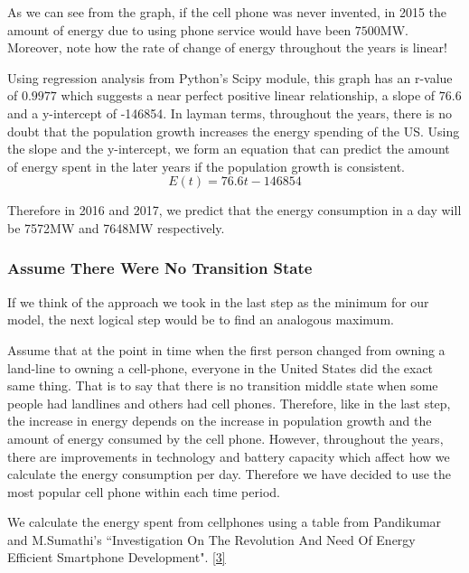 \documentclass{article}
\begin{document}
As we can see from the graph, if the cell phone was never invented, in 2015 the amount of energy due to using phone service would have been $7500 \text{MW}$. Moreover, note how the rate of change of energy throughout the years is linear! \par
Using regression analysis from Python's Scipy module, this graph has an r-value of $0.9977$ which suggests a near perfect positive linear relationship, a slope of $76.6$ and a y-intercept of -146854. In layman terms, throughout the years, there is no doubt that the population growth increases the energy spending of the US. Using the slope and the y-intercept, we form an equation that can predict the amount of energy spent in the later years if the population growth is consistent.
$$ E(t) = 76.6t - 146854 $$ \par
Therefore in 2016 and 2017, we predict that the energy consumption in a day will be 7572MW and 7648MW respectively.\par

%

\subsubsection{Assume There Were No Transition State}
If we think of the approach we took in the last step as the minimum for our model, the next logical step would be to find an analogous maximum.\par 
Assume that at the point in time when the first person changed from owning a land-line to owning a cell-phone, everyone in the United States did the exact same thing. That is to say that there is no transition middle state when some people had landlines and others had cell phones. Therefore, like in the last step, the increase in energy depends on the increase in population growth and the amount of energy consumed by the cell phone. However, throughout the years, there are improvements in technology and battery capacity which affect how we calculate the energy consumption per day. Therefore we have decided to use the most popular cell phone within each time period. \par
We calculate the energy spent from cellphones using a table from Pandikumar and M.Sumathi's ``Investigation On The Revolution And Need Of Energy Efficient Smartphone Development". \ref{3} \cite{phoneBatteries}
\end{document}
